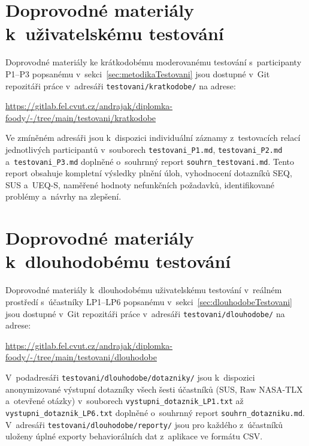 \chapter{Doprovodné materiály k~uživatelskému testování}
\label{app:testovani}

Doprovodné materiály ke krátkodobému moderovanému testování s~participanty P1--P3 popsanému v~sekci~\ref{sec:metodikaTestovani} jsou dostupné v~Git repozitáři práce v~adresáři \texttt{testovani/kratkodobe/} na adrese:

\begin{center}
\url{https://gitlab.fel.cvut.cz/andrajak/diplomka-foody/-/tree/main/testovani/kratkodobe}
\end{center}

Ve zmíněném adresáři jsou k~dispozici individuální záznamy z~testovacích relací jednotlivých participantů v~souborech \texttt{testovani\_\allowbreak P1.md}, \texttt{testovani\_\allowbreak P2.md} a~\texttt{testovani\_\allowbreak P3.md} doplněné o~souhrnný report \texttt{souhrn\_\allowbreak testovani.md}.
Tento report obsahuje kompletní výsledky plnění úloh, vyhodnocení dotazníků SEQ, SUS a~UEQ-S, naměřené hodnoty nefunkčních požadavků, identifikované problémy a~návrhy na zlepšení.

\chapter{Doprovodné materiály k~dlouhodobému testování}
\label{app:dlouhodobeTestovani}

Doprovodné materiály k~dlouhodobému uživatelskému testování v~reálném prostředí s~účastníky LP1--LP6 popsanému v~sekci~\ref{sec:dlouhodobeTestovani} jsou dostupné v~Git repozitáři práce v~adresáři \texttt{testovani/dlouhodobe/} na adrese:

\begin{center}
\url{https://gitlab.fel.cvut.cz/andrajak/diplomka-foody/-/tree/main/testovani/dlouhodobe}
\end{center}

V~podadresáři \texttt{testovani/dlouhodobe/dotazniky/} jsou k~dispozici anonymizované výstupní dotazníky všech šesti účastníků (SUS, Raw NASA-TLX a~otevřené otázky) v~souborech \texttt{vystupni\_\allowbreak dotaznik\_\allowbreak LP1.txt} až \texttt{vystupni\_\allowbreak dotaznik\_\allowbreak LP6.txt} doplněné o~souhrnný report \texttt{souhrn\_\allowbreak dotazniku.md}. V~adresáři \texttt{testovani/dlouhodobe/reporty/} jsou pro každého z~účastníků uloženy úplné exporty behaviorálních dat z~aplikace ve formátu CSV.

